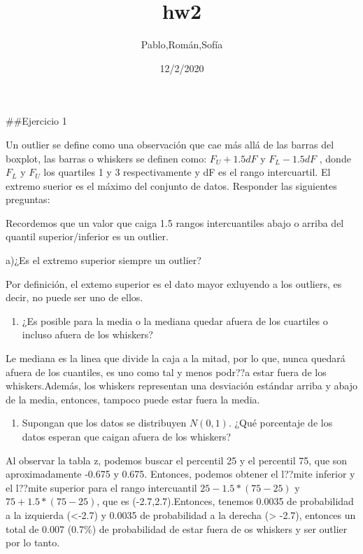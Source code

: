\documentclass[]{article}
\title{hw2}
\author{Pablo,Román,Sofía}
\date{12/2/2020}
\providecommand{\tightlist}{%
  \setlength{\itemsep}{0pt}\setlength{\parskip}{0pt}}
\begin{document}
\maketitle

\#\#Ejercicio 1

Un outlier se define como una observación que cae más allá de las barras
del boxplot, las barras o whiskers se definen como: \(F_U + 1.5dF\) y
\(F_L −1.5dF\) , donde \(F_L\) y \(F_U\) los quartiles 1 y 3
respectivamente y dF es el rango intercuartil. El extremo suerior es el
máximo del conjunto de datos. Responder las siguientes preguntas:

Recordemos que un valor que caiga 1.5 rangos intercuantiles abajo o
arriba del quantil superior/inferior es un outlier.

a)¿Es el extremo superior siempre un outlier?

Por definición, el extemo superior es el dato mayor exluyendo a los
outliers, es decir, no puede ser uno de ellos.

\begin{enumerate}
\def\labelenumi{\alph{enumi})}
\setcounter{enumi}{1}
\tightlist
\item
  ¿Es posible para la media o la mediana quedar afuera de los cuartiles
  o incluso afuera de los whiskers?
\end{enumerate}

Le mediana es la linea que divide la caja a la mitad, por lo que, nunca
quedará afuera de los cuantiles, es uno como tal y menos podr??a estar
fuera de los whiskers.Además, los whiskers representan una desviación
estándar arriba y abajo de la media, entonces, tampoco puede estar fuera
la media.

\begin{enumerate}
\def\labelenumi{\alph{enumi})}
\setcounter{enumi}{2}
\tightlist
\item
  Supongan que los datos se distribuyen \(N(0, 1)\). ¿Qué porcentaje de
  los datos esperan que caigan afuera de los whiskers?
\end{enumerate}

Al observar la tabla z, podemos buscar el percentil 25 y el percentil
75, que son aproximadamente -0.675 y 0.675. Entonces, podemos obtener el
l??mite inferior y el l??mite superior para el rango intercuantil
\(25 - 1.5 * (75 - 25)\) y \(75 + 1.5 * (75 - 25)\), que es
(-2.7,2.7).Entonces, tenemos 0.0035 de probabilidad a la izquierda
(\textless-2.7) y 0.0035 de probabilidad a la derecha (\textgreater{}
-2.7), entonces un total de 0.007 (0.7\%) de probabilidad de estar fuera
de os whiskers y ser outlier por lo tanto.
\end{document}
